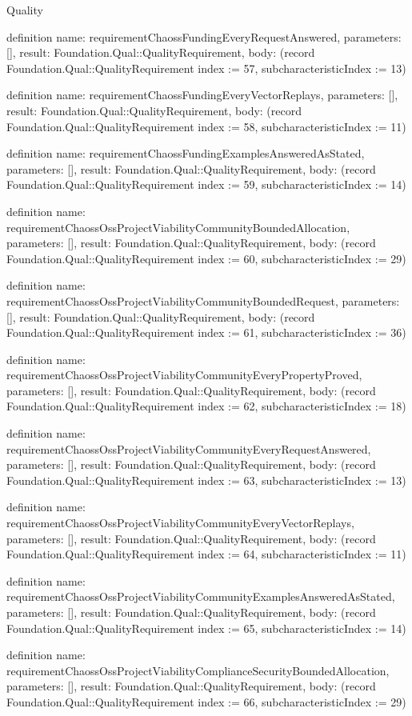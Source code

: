 \begin{lexlean}{Quality}
\begin{semanticmodule}
definition{
  name: requirementChaossFundingEveryRequestAnswered,
  parameters: [],
  result: Foundation.Qual::QualityRequirement,
  body: (record Foundation.Qual::QualityRequirement {index := 57, subcharacteristicIndex := 13})
}

definition{
  name: requirementChaossFundingEveryVectorReplays,
  parameters: [],
  result: Foundation.Qual::QualityRequirement,
  body: (record Foundation.Qual::QualityRequirement {index := 58, subcharacteristicIndex := 11})
}

definition{
  name: requirementChaossFundingExamplesAnsweredAsStated,
  parameters: [],
  result: Foundation.Qual::QualityRequirement,
  body: (record Foundation.Qual::QualityRequirement {index := 59, subcharacteristicIndex := 14})
}

definition{
  name: requirementChaossOssProjectViabilityCommunityBoundedAllocation,
  parameters: [],
  result: Foundation.Qual::QualityRequirement,
  body: (record Foundation.Qual::QualityRequirement {index := 60, subcharacteristicIndex := 29})
}

definition{
  name: requirementChaossOssProjectViabilityCommunityBoundedRequest,
  parameters: [],
  result: Foundation.Qual::QualityRequirement,
  body: (record Foundation.Qual::QualityRequirement {index := 61, subcharacteristicIndex := 36})
}

definition{
  name: requirementChaossOssProjectViabilityCommunityEveryPropertyProved,
  parameters: [],
  result: Foundation.Qual::QualityRequirement,
  body: (record Foundation.Qual::QualityRequirement {index := 62, subcharacteristicIndex := 18})
}

definition{
  name: requirementChaossOssProjectViabilityCommunityEveryRequestAnswered,
  parameters: [],
  result: Foundation.Qual::QualityRequirement,
  body: (record Foundation.Qual::QualityRequirement {index := 63, subcharacteristicIndex := 13})
}

definition{
  name: requirementChaossOssProjectViabilityCommunityEveryVectorReplays,
  parameters: [],
  result: Foundation.Qual::QualityRequirement,
  body: (record Foundation.Qual::QualityRequirement {index := 64, subcharacteristicIndex := 11})
}

definition{
  name: requirementChaossOssProjectViabilityCommunityExamplesAnsweredAsStated,
  parameters: [],
  result: Foundation.Qual::QualityRequirement,
  body: (record Foundation.Qual::QualityRequirement {index := 65, subcharacteristicIndex := 14})
}

definition{
  name: requirementChaossOssProjectViabilityComplianceSecurityBoundedAllocation,
  parameters: [],
  result: Foundation.Qual::QualityRequirement,
  body: (record Foundation.Qual::QualityRequirement {index := 66, subcharacteristicIndex := 29})
}


\end{semanticmodule}
\end{lexlean}
